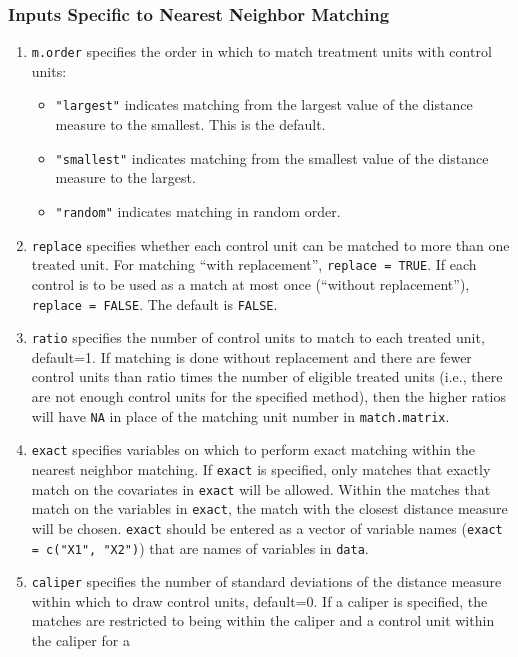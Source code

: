 \documentclass[oneside,letterpaper,titlepage]{article}
\begin{document}
\subsubsection{Inputs Specific to Nearest Neighbor Matching}
\label{subsubsec:nninputs}
\begin{enumerate}
\item \texttt{m.order}  specifies the order in which to match
  treatment units with control units:
  \begin{itemize}
  \item {\tt "largest"} indicates matching from the largest value of
    the distance measure to the smallest. This is the default.
  \item {\tt "smallest"} indicates matching from the smallest value of
    the distance measure to the largest.
  \item {\tt "random"} indicates matching in random order.
  \end{itemize}
\item \texttt{replace} specifies whether each control unit can be
  matched to more than one treated unit.  For matching ``with
  replacement'', \texttt{replace = TRUE}.  If each control is to be
  used as a match at most once (``without replacement''), \texttt{replace
    = FALSE}. The default is {\tt FALSE}.
\item \texttt{ratio} specifies the number of control units to match to
  each treated unit, default=1.  If matching is done without
  replacement and there are fewer control units than ratio times the
  number of eligible treated units (i.e., there are not enough control 
  units for the specified method), then the higher ratios will have
  \texttt{NA} in place of the matching unit number in
  \texttt{match.matrix}.
\item \texttt{exact} specifies variables on which to perform exact
  matching within the nearest neighbor matching.  If \texttt{exact} is
  specified, only matches that exactly match on the covariates in
  \texttt{exact} will be allowed.  Within the matches that match on
  the variables in \texttt{exact}, the match with the closest distance
  measure will be chosen.  \texttt{exact} should be entered as a
  vector of variable names (\texttt{exact = c("X1", "X2")}) that are
  names of variables in \texttt{data}.
\item \texttt{caliper} specifies the number of standard deviations of
  the distance measure within which to draw control units, default=0.
  If a caliper is specified, the matches are restricted to being
  within the caliper and a control unit within the caliper for a

\end{enumerate}
\end{document}
